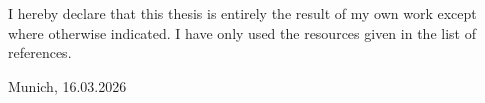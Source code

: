 \null\vfill
I hereby declare that this thesis is entirely the result of my own work
except where otherwise indicated. I have only used the resources given in
the list of references. 
\vspace{10ex}

Munich, 16.03.2026

\vspace{10ex}
